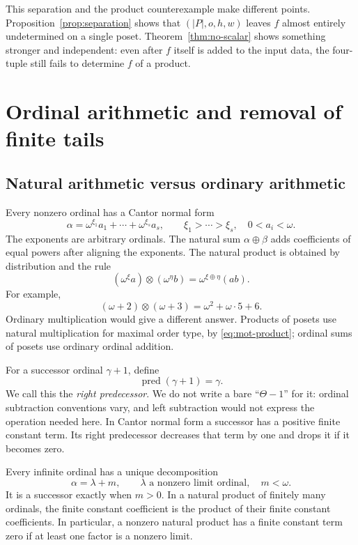 \documentclass[11pt,letterpaper]{article}
\theoremstyle{definition}
\theoremstyle{remark}
\newcommand{\pred}{\operatorname{pred}}
\begin{document}
This separation and the product counterexample make different points.
Proposition~\ref{prop:separation} shows that $(|P|,o,h,w)$ leaves $f$ almost
entirely undetermined on a single poset. Theorem~\ref{thm:no-scalar} shows
something stronger and independent: even after $f$ itself is added to the
input data, the four-tuple still fails to determine $f$ of a product.

\section{Ordinal arithmetic and removal of finite tails}\label{sec:tails}

\subsection{Natural arithmetic versus ordinary arithmetic}
Every nonzero ordinal has a Cantor normal form
\[
 \alpha=\omega^{\xi_1}a_1+\cdots+\omega^{\xi_s}a_s,
 \qquad \xi_1>\cdots>\xi_s,\quad 0<a_i<\omega.
\]
The exponents are arbitrary ordinals. The natural sum $\alpha\oplus\beta$
adds coefficients of equal powers after aligning the exponents. The
natural product is obtained by distribution and the rule
\[
 (\omega^\xi a)\otimes(\omega^\eta b)
 =\omega^{\xi\oplus\eta}(ab).
\]
For example,
\begin{equation}\label{eq:cnf-example}
 (\omega+2)\otimes(\omega+3)=\omega^2+\omega\cdot5+6.
\end{equation}
Ordinary multiplication would give a different answer. Products of posets
use natural multiplication for maximal order type, by
\eqref{eq:mot-product}; ordinal sums of posets use ordinary ordinal
addition.

For a successor ordinal $\gamma+1$, define
\[
 \pred(\gamma+1)=\gamma.
\]
We call this the \emph{right predecessor}. We do not write a bare
``$\Theta-1$'' for it: ordinal subtraction conventions vary, and left
subtraction would not express the operation needed here. In Cantor normal
form a successor has a positive finite constant term. Its right
predecessor decreases that term by one and drops it if it becomes zero.

Every infinite ordinal has a unique decomposition
\begin{equation}\label{eq:finite-tail}
 \alpha=\lambda+m,
 \qquad \lambda\text{ a nonzero limit ordinal},\quad m<\omega.
\end{equation}
It is a successor exactly when $m>0$. In a natural product of finitely many
ordinals, the finite constant coefficient is the product of their finite
constant coefficients. In particular, a nonzero natural product has a
finite constant term zero if at least one factor is a nonzero limit.
\end{document}
